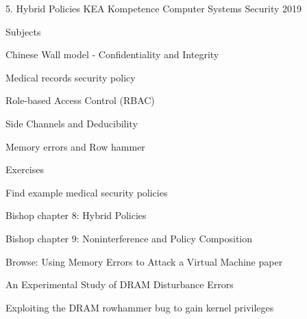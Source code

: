 \documentclass[Screen16to9,17pt]{foils}
\begin{document}
\mytitlepage
{5. Hybrid Policies}
{KEA Kompetence Computer Systems Security 2019}



\begin{list1}
\item Subjects
\begin{list2}
\item Chinese Wall model - Confidentiality and Integrity
\item Medical records security policy
\item Role-based Access Control (RBAC)
\item Side Channels and Deducibility
\item Memory errors and Row hammer
\end{list2}
\item Exercises
\begin{list2}
\item Find example medical security policies
\item
\end{list2}
\end{list1}




\begin{list1}
\item Bishop chapter 8: Hybrid Policies
\item Bishop chapter 9: Noninterference and Policy Composition
\item Browse: Using Memory Errors to Attack a Virtual Machine paper
\item An Experimental Study of DRAM Disturbance Errors
\item Exploiting the DRAM rowhammer bug to gain kernel privileges
\item {}
\end{list1}













\slidenext
\end{document}
